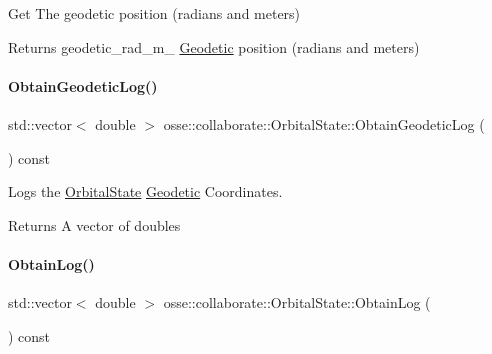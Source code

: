 Get The geodetic position (radians and meters) 

\begin{DoxyReturn}{Returns}
geodetic\+\_\+rad\+\_\+m\+\_\+ \hyperlink{classosse_1_1collaborate_1_1_geodetic}{Geodetic} position (radians and meters) 
\end{DoxyReturn}
\mbox{\label{classosse_1_1collaborate_1_1_orbital_state_a5ef68d5b425411e26612f213ab406136}} 
\paragraph{\texorpdfstring{Obtain\+Geodetic\+Log()}{ObtainGeodeticLog()}}
{\footnotesize\ttfamily std\+::vector$<$ double $>$ osse\+::collaborate\+::\+Orbital\+State\+::\+Obtain\+Geodetic\+Log (\begin{DoxyParamCaption}{ }\end{DoxyParamCaption}) const}



Logs the \hyperlink{classosse_1_1collaborate_1_1_orbital_state}{Orbital\+State} \hyperlink{classosse_1_1collaborate_1_1_geodetic}{Geodetic} Coordinates. 

\begin{DoxyReturn}{Returns}
A vector of doubles 
\end{DoxyReturn}
\mbox{\label{classosse_1_1collaborate_1_1_orbital_state_a010c89b843916c12e8d6ec4042787af6}} 
\paragraph{\texorpdfstring{Obtain\+Log()}{ObtainLog()}}
{\footnotesize\ttfamily std\+::vector$<$ double $>$ osse\+::collaborate\+::\+Orbital\+State\+::\+Obtain\+Log (\begin{DoxyParamCaption}{ }\end{DoxyParamCaption}) const}



